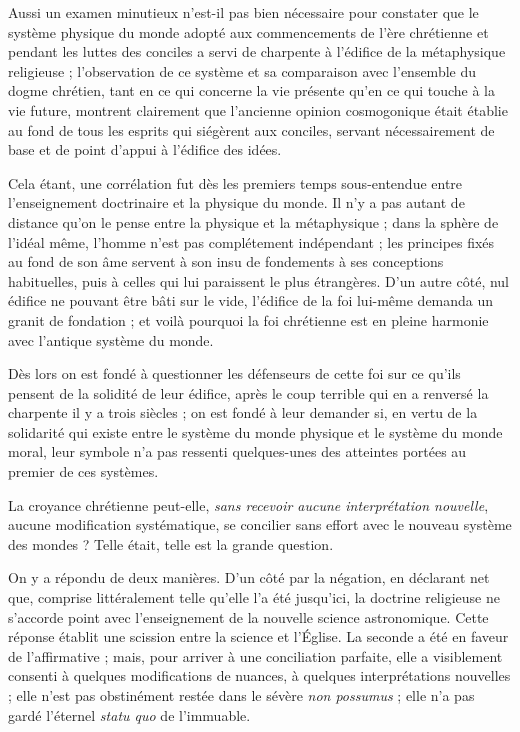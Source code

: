 \documentclass[a4paper, 11pt, oneside]{article}
\begin{document}
Aussi un examen minutieux n'est-il pas bien nécessaire pour constater que le système physique du monde adopté aux commencements de l'ère chrétienne et pendant les luttes des conciles a servi de charpente à l'édifice de la métaphysique religieuse ; l'observation de ce système et sa comparaison avec l'ensemble du dogme chrétien, tant en ce qui concerne la vie présente qu'en ce qui touche à la vie future, montrent clairement que l'ancienne opinion cosmogonique était établie au fond de tous les esprits qui siégèrent aux conciles, servant nécessairement de base et de point d'appui à l'édifice des idées.

Cela étant, une corrélation fut dès les premiers temps sous-entendue entre l'enseignement doctrinaire et la physique du monde. Il n'y a pas autant de distance qu'on le pense entre la physique et la métaphysique ; dans la sphère de l'idéal même, l'homme n'est pas complétement indépendant ; les principes fixés au fond de son âme servent à son insu de fondements à ses conceptions habituelles, puis à celles qui lui paraissent le plus étrangères. D'un autre côté, nul édifice ne pouvant être bâti sur le vide, l'édifice de la foi lui-même demanda un granit de fondation ; et voilà pourquoi la foi chrétienne est en pleine harmonie avec l'antique système du monde.

Dès lors on est fondé à questionner les défenseurs de cette foi sur ce qu'ils pensent de la solidité de leur édifice, après le coup terrible qui en a renversé la charpente il y a trois siècles ; on est fondé à leur demander si, en vertu de la solidarité qui existe entre le système du monde physique et le système du monde moral, leur symbole n'a pas ressenti quelques-unes des atteintes portées au premier de ces systèmes.

La croyance chrétienne peut-elle, \emph{sans recevoir aucune interprétation nouvelle}, aucune modification systématique, se concilier sans effort avec le nouveau système des mondes ? Telle était, telle est la grande question.

On y a répondu de deux manières. D'un côté par la négation, en déclarant net que, comprise littéralement telle qu'elle l'a été jusqu'ici, la doctrine religieuse ne s'accorde point avec l'enseignement de la nouvelle science astronomique. Cette réponse établit une scission entre la science et l'Église. La seconde a été en faveur de l'affirmative ; mais, pour arriver à une conciliation parfaite, elle a visiblement consenti à quelques modifications de nuances, à quelques interprétations nouvelles ; elle n'est pas obstinément restée dans le sévère \emph{non possumus} ; elle n'a pas gardé l'éternel \emph{statu quo} de l'immuable.
\end{document}
